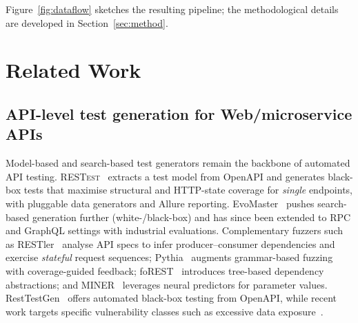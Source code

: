 \documentclass[conference]{IEEEtran}
\begin{document}
Figure~\ref{fig:dataflow} sketches the resulting pipeline; the
methodological details are developed in Section~\ref{sec:method}.



\section{Related Work}
\label{sec:related}

\subsection{API-level test generation for Web/microservice APIs}
Model-based and search-based test generators remain the backbone of automated API testing.
\textsc{RESTest}~\cite{martin2019restest} extracts a test model from OpenAPI and generates black-box tests that maximise structural and HTTP-state coverage for \emph{single} endpoints, with pluggable data generators and Allure reporting.
EvoMaster~\cite{arcuri2019restful} pushes search-based generation further (white-/black-box) and has since been extended to RPC and GraphQL settings with industrial evaluations.
Complementary fuzzers such as RESTler~\cite{atlidakis2019restler} analyse API specs to infer producer--consumer dependencies and exercise \emph{stateful} request sequences; Pythia~\cite{atlidakis2020pythia} augments grammar-based fuzzing with coverage-guided feedback; foREST~\cite{lin2022forest} introduces tree-based dependency abstractions; and MINER~\cite{lyu2023miner} leverages neural predictors for parameter values.
RestTestGen~\cite{viglianisi2020resttestgen} offers automated black-box testing from OpenAPI, while recent work targets specific vulnerability classes such as excessive data exposure~\cite{pan2023edefuzz}.
\end{document}
